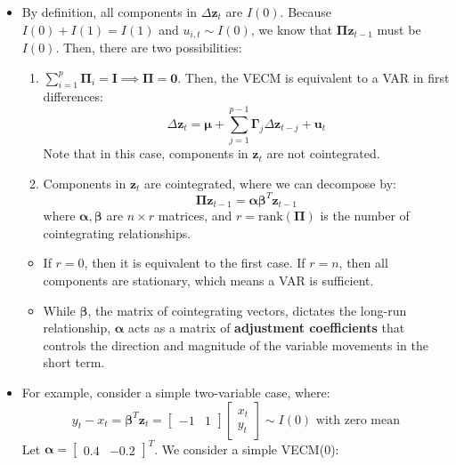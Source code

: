 \documentclass[notitlepage]{article}
\begin{document}
\begin{itemize}
    \item By definition, all components in \(\Delta \mathbf{z}_t\) are \(I(0)\). Because \(I(0)+I(1)=I(1)\) and \(u_{i,t} \sim I(0)\), we know that \(\boldsymbol{\Pi}\mathbf{z}_{t-1}\) must be \(I(0)\). Then, there are two possibilities:
    \begin{enumerate}
        \item \(\sum_{i=1}^p \boldsymbol\Pi_i = \mathbf{I} \implies  \boldsymbol\Pi = \mathbf{0}\). Then, the VECM is equivalent to a VAR in first differences:
        \[
        \Delta \mathbf{z}_t
        = \boldsymbol\mu + \sum_{j=1}^{p-1}\boldsymbol{\Gamma}_{j} \Delta \mathbf{z}_{t-j} + \mathbf{u}_t
        \]
        Note that in this case, components in \(\mathbf{z}_t\) are not cointegrated.
        \item Components in \(\mathbf{z}_t\) are cointegrated, where we can decompose by:
        \[
        \boldsymbol{\Pi}\mathbf{z}_{t-1} = \boldsymbol{\alpha}\boldsymbol{\beta}^T\mathbf{z}_{t-1}
        \]
        where \(\boldsymbol{\alpha},\boldsymbol{\beta}\) are \(n \times r\) matrices, and \(r = \text{rank}(\boldsymbol{\Pi})\) is the number of cointegrating relationships.
    \end{enumerate}
    \begin{itemize}
        \item If \(r=0\), then it is equivalent to the first case. If \(r=n\), then all components are stationary, which means a VAR is sufficient.
        \item While \(\boldsymbol{\beta}\), the matrix of cointegrating vectors, dictates the long-run relationship, \(\boldsymbol{\alpha}\) acts as a matrix of \textbf{adjustment coefficients} that controls the direction and magnitude of the variable movements in the short term.
    \end{itemize}
    \item For example, consider a simple two-variable case, where:
    \[
    y_t - x_t = \boldsymbol{\beta}^T\mathbf{z}_t = \begin{bmatrix} -1 & 1 \end{bmatrix} \begin{bmatrix} x_t \\ y_t \end{bmatrix} \sim I(0) \text{ with zero mean}
    \]
    Let \(\boldsymbol{\alpha} = \begin{bmatrix} 0.4 & -0.2\end{bmatrix}^T\). We consider a simple VECM(0):
    \[
\]
\end{itemize}
\end{document}

